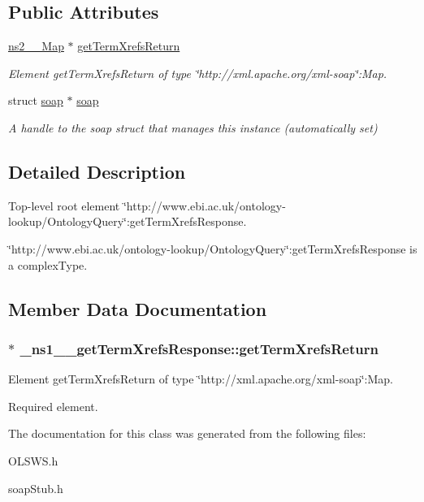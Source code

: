 \subsection*{Public Attributes}
\begin{DoxyCompactItemize}
\item 
\hyperlink{classns2____Map}{ns2\_\-\_\-Map} $\ast$ \hyperlink{class__ns1____getTermXrefsResponse_aad176d779e4c85ec1a0c6761e8981f84}{getTermXrefsReturn}
\begin{DoxyCompactList}\small\item\em Element getTermXrefsReturn of type \char`\"{}http://xml.apache.org/xml-\/soap\char`\"{}:Map. \end{DoxyCompactList}\item 
\hypertarget{class__ns1____getTermXrefsResponse_a3c4830eabf5a7067362608ded1002a58}{
struct \hyperlink{class__ns1____getTermXrefsResponse_a3c4830eabf5a7067362608ded1002a58}{soap} $\ast$ \hyperlink{class__ns1____getTermXrefsResponse_a3c4830eabf5a7067362608ded1002a58}{soap}}
\label{class__ns1____getTermXrefsResponse_a3c4830eabf5a7067362608ded1002a58}

\begin{DoxyCompactList}\small\item\em A handle to the soap struct that manages this instance (automatically set) \end{DoxyCompactList}\end{DoxyCompactItemize}


\subsection{Detailed Description}
Top-\/level root element \char`\"{}http://www.ebi.ac.uk/ontology-\/lookup/OntologyQuery\char`\"{}:getTermXrefsResponse. 

\char`\"{}http://www.ebi.ac.uk/ontology-\/lookup/OntologyQuery\char`\"{}:getTermXrefsResponse is a complexType. 

\subsection{Member Data Documentation}
\hypertarget{class__ns1____getTermXrefsResponse_aad176d779e4c85ec1a0c6761e8981f84}{
\subsubsection[{getTermXrefsReturn}]{ $\ast$ {\bf \_\-ns1\_\-\_\-getTermXrefsResponse::getTermXrefsReturn}}}
\label{class__ns1____getTermXrefsResponse_aad176d779e4c85ec1a0c6761e8981f84}


Element getTermXrefsReturn of type \char`\"{}http://xml.apache.org/xml-\/soap\char`\"{}:Map. 

Required element. 

The documentation for this class was generated from the following files:\begin{DoxyCompactItemize}
\item 
OLSWS.h\item 
soapStub.h\end{DoxyCompactItemize}
